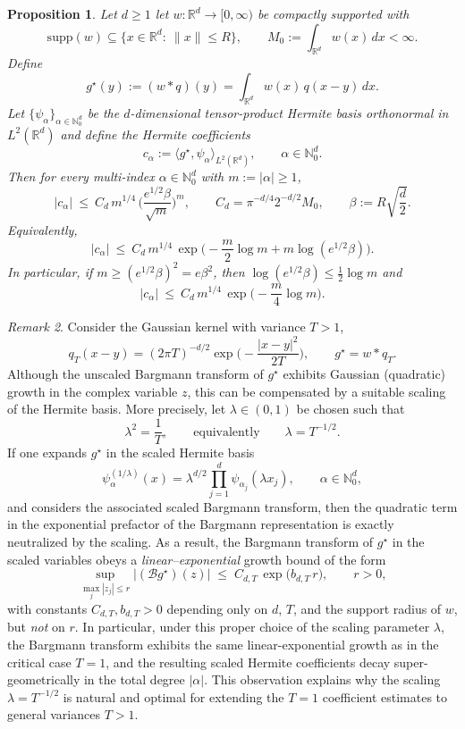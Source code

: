 \documentclass[11pt]{article}
\newtheorem{proposition}{Proposition}[section] %
\theoremstyle{remark}
\newtheorem{remark}[proposition]{Remark}
\numberwithin{equation}{section}
\newcommand{\R}{\mathbb{R}}
\newcommand{\N}{\mathbb{N}}
\begin{document}
\begin{proposition}
\label{prop:hermite-coeff}
Let $d\ge 1$ let $w:\R^d\to[0,\infty)$ be compactly supported with
\[
\mathrm{supp}(w)\subseteq \{x\in\R^d:\ \|x\|\le R\}, 
\qquad 
M_0:=\int_{\R^d} w(x)\,dx<\infty .
\]
Define
\[
g^\star(y):=(w*q)(y)=\int_{\R^d} w(x)\,q(x-y)\,dx .
\]
Let $\{\psi_\alpha\}_{\alpha\in\N_0^d}$ be the $d$-dimensional tensor-product Hermite basis orthonormal in $L^2(\R^d)$
and define the Hermite coefficients
\[
c_\alpha:=\langle g^\star,\psi_\alpha\rangle_{L^2(\R^d)} ,\qquad \alpha\in\N_0^d.
\]
Then for every multi-index $\alpha\in\N_0^d$ with $m:=|\alpha|\ge 1$,
\begin{equation}\label{eq:coeff-bound-T1-clean}
|c_\alpha|
\ \le\
C_d\,
m^{1/4}\,
\Big(\frac{e^{1/2}\beta}{\sqrt m}\Big)^{m},
\qquad 
C_d=\pi^{-d/4}2^{-d/2}M_0,
\qquad
\beta:=R\sqrt{\frac d2}.
\end{equation}
Equivalently,
\begin{equation}\label{eq:coeff-bound-T1-logform}
|c_\alpha|
\ \le\
C_d\,
m^{1/4}\,
\exp\!\Big(-\frac m2\log m + m\log(e^{1/2}\beta)\Big).
\end{equation}
In particular, if $m\ge (e^{1/2}\beta)^2=e\beta^2$, then $\log(e^{1/2}\beta)\le \tfrac12\log m$ and 
\begin{equation}\label{eq:coeff-supergeom-T1}
|c_\alpha|
\ \le\
C_d\,
m^{1/4}\,
\exp\!\Big(-\frac m4\log m\Big).
\end{equation}
\end{proposition}
\begin{remark}\label{rem:choice-lambda-linear-growth}
Consider the Gaussian kernel with variance $T>1$,
\[
q_T(x-y)=(2\pi T)^{-d/2}\exp\!\Big(-\frac{|x-y|^2}{2T}\Big),
\qquad g^\star=w*q_T .
\]
Although the unscaled Bargmann transform of $g^\star$ exhibits Gaussian
(quadratic) growth in the complex variable $z$, this can be compensated by a
suitable scaling of the Hermite basis.
More precisely, let $\lambda\in(0,1)$ be chosen such that
\[
\lambda^2=\frac{1}{T},
\qquad\text{equivalently}\qquad
\lambda=T^{-1/2}.
\]
If one expands $g^\star$ in the scaled Hermite basis
\[
\psi_\alpha^{(1/\lambda)}(x)
=\lambda^{d/2}\prod_{j=1}^d \psi_{\alpha_j}(\lambda x_j),
\qquad \alpha\in\N_0^d,
\]
and considers the associated scaled Bargmann transform, then the quadratic term
in the exponential prefactor of the Bargmann representation is exactly
neutralized by the scaling.
As a result, the Bargmann transform of $g^\star$ in the scaled variables obeys a
\emph{linear--exponential} growth bound of the form
\[
\sup_{\max_j|z_j|\le r}
\big|(\mathcal B g^\star)(z)\big|
\;\le\;
C_{d,T}\,
\exp\!\big(b_{d,T}\,r\big),
\qquad r>0,
\]
with constants $C_{d,T},b_{d,T}>0$ depending only on $d$, $T$, and the support
radius of $w$, but \emph{not} on $r$.
In particular, under this proper choice of the scaling parameter $\lambda$, the
Bargmann transform exhibits the same linear-exponential growth as in the
critical case $T=1$, and the resulting scaled Hermite coefficients decay
super-geometrically in the total degree $|\alpha|$. This observation explains
why the scaling $\lambda=T^{-1/2}$ is natural and optimal for extending the
$T=1$ coefficient estimates to general variances $T>1$.
\end{remark}
\end{document}
